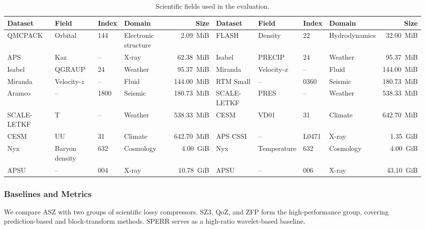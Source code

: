 \begin{table}[htb]
    \centering
    \caption{Scientific fields used in the evaluation.}
    \label{tab:evaluation-datasets}
    \footnotesize
    \setlength{\tabcolsep}{3pt}
    \begin{tabular}{@{}lll lr@{\hspace{0.8em}}|@{\hspace{0.8em}}lll lr@{}}
        \toprule
        \textbf{Dataset} & \textbf{Field} & \textbf{Index} & \textbf{Domain} & \textbf{Size} &
        \textbf{Dataset} & \textbf{Field} & \textbf{Index} & \textbf{Domain} & \textbf{Size} \\
        \midrule
        QMCPACK & Orbital & 144 & Electronic structure & 2.09~MiB & FLASH & Density & 22 & Hydrodynamics & 32.00~MiB \\
        APS & Kaz & -- & X-ray & 62.38~MiB & Isabel & PRECIP & 24 & Weather & 95.37~MiB \\
        Isabel & QGRAUP & 24 & Weather & 95.37~MiB & Miranda & Velocity-$x$ & -- & Fluid & 144.00~MiB \\
        Miranda & Velocity-$z$ & -- & Fluid & 144.00~MiB & RTM Small & -- & 0360 & Seismic & 180.73~MiB \\
        Aramco & -- & 1800 & Seismic & 180.73~MiB & SCALE-LETKF & PRES & -- & Weather & 538.33~MiB \\
        SCALE-LETKF & T & -- & Weather & 538.33~MiB & CESM & VD01 & 31 & Climate & 642.70~MiB \\
        CESM & UU & 31 & Climate & 642.70~MiB & APS CSSI & -- & L0471 & X-ray & 1.35~GiB \\
        Nyx & Baryon density & 632 & Cosmology & 4.00~GiB & Nyx & Temperature & 632 & Cosmology & 4.00~GiB \\
        APSU & -- & 004 & X-ray & 10.78~GiB & APSU & -- & 006 & X-ray & 43.10~GiB \\
        \bottomrule
    \end{tabular}
\end{table}

\subsubsection{Baselines and Metrics}

We compare ASZ with two groups of scientific lossy compressors. SZ3, QoZ, and ZFP form the high-performance group, covering prediction-based and block-transform methods. SPERR serves as a high-ratio wavelet-based baseline.


